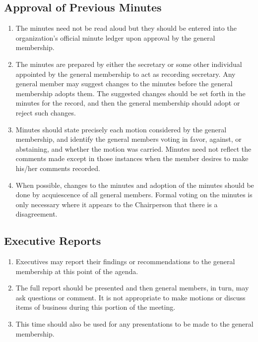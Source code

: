 \documentclass[12pt]{article}
\begin{document}
\subsection{Approval of Previous Minutes}
\begin{enumerate}[{A.3}.1]
    \item The minutes need not be read aloud but they should be entered into the organization’s official minute ledger upon approval by the general membership.
    \item The minutes are prepared by either the secretary or some other individual appointed by the general membership to act as recording secretary. Any general member may suggest changes to the minutes before the general membership adopts them. The suggested changes should be set forth in the minutes for the record, and then the general membership should adopt or reject such changes.
    \item Minutes should state precisely each motion considered by the general membership, and identify the general members voting in favor, against, or abstaining, and whether the motion was carried. Minutes need not reflect the comments made except in those instances when the member desires to make his/her comments recorded. 
    \item When possible, changes to the minutes and adoption of the minutes should be done by acquiescence of all general members. Formal voting on the minutes is only necessary where it appears to the Chairperson that there is a disagreement.
\end{enumerate}


\subsection{Executive Reports}
\begin{enumerate}[{A.4}.1]
    \item Executives may report their findings or recommendations to the general membership at this point of the agenda. 
    \item The full report should be presented and then general members, in turn, may ask questions or comment. It is not appropriate to make motions or discuss items of business during this portion of the meeting.
    \item This time should also be used for any presentations to be made to the general membership.
\end{enumerate}


\end{document}
